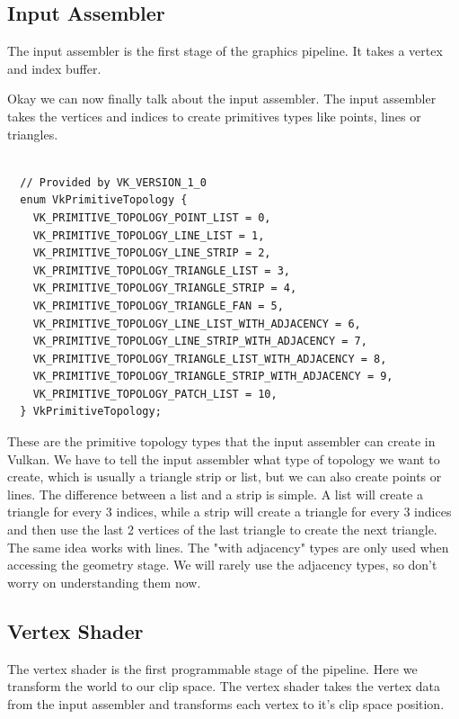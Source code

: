 \documentclass[12pt]{report} \usepackage{preamble}
\begin{document}
\subsection{Input Assembler}

The input assembler is the first stage of the graphics pipeline. It takes
a vertex and index buffer. \cite{vulkan-spec-pipelines}

Okay we can now finally talk about the input assembler. The input
assembler takes the vertices and indices to create primitives types like
points, lines or triangles. \cite{microsoft-ia}

\newpage

\begin{lstlisting}[Language=C++] 

  // Provided by VK_VERSION_1_0
  enum VkPrimitiveTopology {
    VK_PRIMITIVE_TOPOLOGY_POINT_LIST = 0,
    VK_PRIMITIVE_TOPOLOGY_LINE_LIST = 1,
    VK_PRIMITIVE_TOPOLOGY_LINE_STRIP = 2,
    VK_PRIMITIVE_TOPOLOGY_TRIANGLE_LIST = 3,
    VK_PRIMITIVE_TOPOLOGY_TRIANGLE_STRIP = 4,
    VK_PRIMITIVE_TOPOLOGY_TRIANGLE_FAN = 5,
    VK_PRIMITIVE_TOPOLOGY_LINE_LIST_WITH_ADJACENCY = 6,
    VK_PRIMITIVE_TOPOLOGY_LINE_STRIP_WITH_ADJACENCY = 7,
    VK_PRIMITIVE_TOPOLOGY_TRIANGLE_LIST_WITH_ADJACENCY = 8,
    VK_PRIMITIVE_TOPOLOGY_TRIANGLE_STRIP_WITH_ADJACENCY = 9,
    VK_PRIMITIVE_TOPOLOGY_PATCH_LIST = 10,
  } VkPrimitiveTopology; 
  \end{lstlisting} \cite{vulkan-spec-primitive-topology}

These are the primitive topology types that the input assembler can
create in Vulkan.  We have to tell the input assembler what type of
topology we want to create, which is usually a triangle strip or list,
but we can also create points or lines.  The difference between a list
and a strip is simple. A list will create a triangle for every 3 indices,
while a strip will create a triangle for every 3 indices and then use
the last 2 vertices of the last triangle to create the next triangle.
The same idea works with lines. The "with adjacency" types are only
used when accessing the geometry stage. We will rarely use
the adjacency types, so don't worry on understanding them now. \cite{vulkan-spec-primitive-topology}

\subsection{Vertex Shader}

The vertex shader is the first programmable stage of the pipeline.
Here we transform the world to our clip space. The vertex shader takes
the vertex data from the input assembler and transforms each vertex
to it's clip space position. \cite{vulkan-tutorial-shader-modules}
\end{document}
